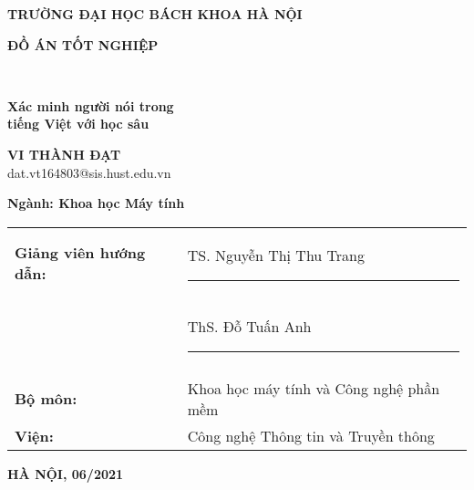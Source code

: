\documentclass[a4paper, 13pt, oneside]{report}
\begin{document}
\fontsize{13pt}{16pt}
\selectfont

\begin{center}
    \thispagestyle{empty}
    \textsc{\LARGE \bfseries TRƯỜNG ĐẠI HỌC BÁCH KHOA HÀ NỘI }
    \vspace{0.5cm}
    
    \vspace{3cm}
    
    \begin{minipage}{0.9\textwidth} 
    \begin{center}
      \textsc{\huge  \bfseries ĐỒ ÁN TỐT NGHIỆP}
    \end{center}
    \end{minipage}\\[0.5cm]
  
    \vspace*{0.3cm}

    { \Huge \bfseries
    \vspace{5px} Xác minh người nói trong\\ tiếng Việt với học sâu}\\ [0.4cm]
    \vspace*{1cm}
    
    { \LARGE \bfseries
        VI THÀNH ĐẠT \\
    }
    {\Large dat.vt164803@sis.hust.edu.vn}
    \vspace{0.5cm}
    
    {\Large \textbf{Ngành: Khoa học Máy tính}}
    
    \vspace{2.5cm}
    
    \begin{tabular}{ll}
    \textbf{Giảng viên hướng dẫn:} & TS. Nguyễn Thị Thu Trang \rule{3cm}{0.4pt} \\
                                   & ThS. Đỗ Tuấn Anh \ \ \ \ \ \ \ \ \ \ \ \rule{3cm}{0.4pt} \\
    & \\
    \textbf{Bộ môn:} & Khoa học máy tính và Công nghệ phần mềm \\
    \textbf{Viện:} & Công nghệ Thông tin và Truyền thông\\
    \end{tabular}
    

    \vspace{3.5cm} 	
    \begin{center}
        {\LARGE \bfseries HÀ NỘI, 06/2021}
    \end{center}
  
\end{center}
\end{document}
